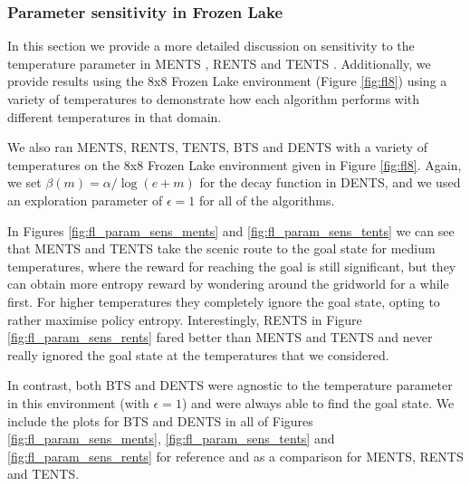 
        \subsubsection{Parameter sensitivity in Frozen Lake} \label{app:param_sens_fl}


            In this section we provide a more detailed discussion on sensitivity to the temperature parameter in MENTS %
            , RENTS and TENTS %
            . 
            Additionally, we provide results using the 8x8 Frozen Lake environment (Figure \ref{fig:fl8}) using a variety of temperatures to demonstrate how each algorithm performs with different temperatures in that domain.

            We also ran MENTS, RENTS, TENTS, BTS and DENTS with a variety of temperatures on the 8x8 Frozen Lake environment given in Figure \ref{fig:fl8}. Again, we set $\beta(m)=\alpha/\log(e+m)$ for the decay function in DENTS, and we used an exploration parameter of $\epsilon=1$ for all of the algorithms. 

            In Figures \ref{fig:fl_param_sens_ments} and \ref{fig:fl_param_sens_tents} we can see that MENTS and TENTS take the scenic route to the goal state for medium temperatures, where the reward for reaching the goal is still significant, but they can obtain more entropy reward by wondering around the gridworld for a while first. For higher temperatures they completely ignore the goal state, opting to rather maximise policy entropy. Interestingly, RENTS in Figure \ref{fig:fl_param_sens_rents} fared better than MENTS and TENTS and never really ignored the goal state at the temperatures that we considered.

            In contrast, both BTS and DENTS were agnostic to the temperature parameter in this environment (with $\epsilon=1$) and were always able to find the goal state. We include the plots for BTS and DENTS in all of Figures \ref{fig:fl_param_sens_ments}, \ref{fig:fl_param_sens_tents} and \ref{fig:fl_param_sens_rents} for reference and as a comparison for MENTS, RENTS and TENTS.
        
